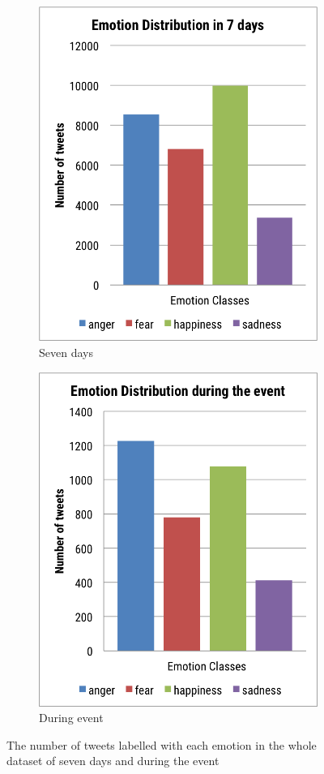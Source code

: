 \begin{figure}[!htb]
\centering 
\begin{subfigure}{0.5\textwidth}
\centering
\includegraphics[width=0.75\linewidth]{EmotionDistributionWeek}
\caption{Seven days}
\label{fig:emotionDistributionWeek}
\end{subfigure}%
\begin{subfigure}{0.5\textwidth}
\centering
\includegraphics[width=0.75\linewidth]{EmotionDistributionEvent}
\caption{During event}
\label{fig:emotionDistributionEvent}
\end{subfigure}
\caption{The number of tweets labelled with each emotion in the whole dataset of seven days and during the event}
\end{figure}

